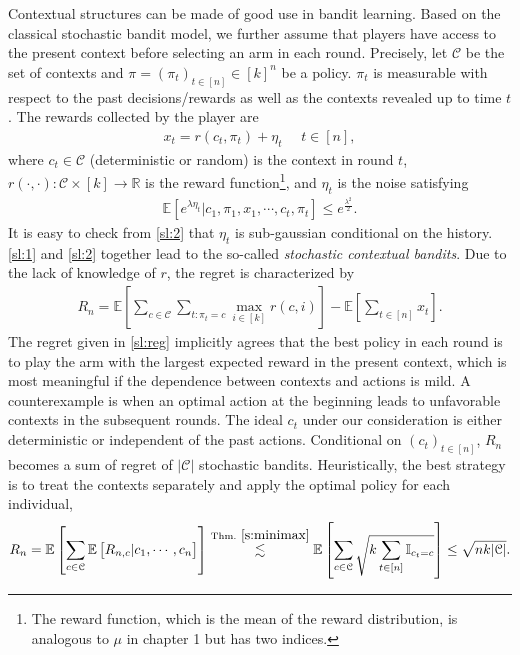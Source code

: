\documentclass[letterpaper,11pt,openright,openany]{book}
\numberwithin{equation}{section}
\theoremstyle{plain}
\theoremstyle{definition}
\def\R{{\mathbb R}}
\def\E{{\mathbb E}}
\def\R{{\mathbb R}}
\begin{document}
Contextual structures can be made of good use in bandit learning. Based on the classical stochastic bandit model, we further assume that players have access to the present context before selecting an arm in each round. Precisely, let $\mathcal C$ be the set of contexts and $\pi=(\pi_t)_{t\in [n]}\in [k]^n$ be a policy. $\pi_t$ is measurable with respect to the past decisions/rewards as well as the contexts revealed up to time $t$. The rewards collected by the player are 
\begin{align}
x_{t} = r(c_t, \pi_t)+\eta_{t}\ \ \ \ \ \ t\in [n],\label{sl:1}
\end{align}
where $c_t\in\mathcal C$ (deterministic or random) is the context in round $t$, $r(\cdot, \cdot):\mathcal C\times [k]\to\R$ is the reward function\footnote{The reward function, which is the mean of the reward distribution, is analogous to $\mu$ in chapter 1 but has two indices.}, and $\eta_{t}$ is the noise satisfying 
\begin{align}
\E[e^{\lambda\eta_{t}}|c_{1}, \pi_{1}, x_{1}, \cdots, c_{t}, \pi_{t}]\leq e^{\frac{\lambda^2}{2}}. \label{sl:2}
\end{align}
It is easy to check from \eqref{sl:2} that $\eta_t$ is sub-gaussian conditional on the history. \eqref{sl:1} and \eqref{sl:2} together lead to the so-called \emph{stochastic contextual bandits}. Due to the lack of knowledge of $r$, the regret is characterized by 
\begin{align}
R_n = \E\left[\sum_{c\in\mathcal C}\sum_{t: \pi_t = c}\max_{i\in [k]}r(c, i)\right] - \E\left[\sum_{t\in [n]}x_{t}\right]. \label{sl:reg}
\end{align}
The regret given in \eqref{sl:reg} implicitly agrees that the best policy in each round is to play the arm with the largest expected reward in the present context, which is most meaningful if the dependence between contexts and actions is mild. A counterexample is when an optimal action at the beginning leads to unfavorable contexts in the subsequent rounds. The ideal $c_t$ under our consideration is either deterministic or independent of the past actions.  Conditional on $(c_t)_{t\in [n]}$, $R_n$ becomes a sum of regret of $|\mathcal C|$ stochastic bandits. Heuristically, the best strategy is to treat the contexts separately and apply the optimal policy for each individual,  
\begin{align}
R_n=\E\left[\sum_{c\in\mathcal C}\E\left[R_{n,c}|c_1, \cdots, c_n\right]\right]\stackrel{\text{Thm.}\ \ref{s:minimax}}{\lesssim}\E\left[\sum_{c\in\mathcal C}\sqrt{k\sum_{t\in [n]}\mathbb I_{c_t = c}}\right]\leq\sqrt{nk|\mathcal C|}.\label{sl:3}
\end{align} 
\end{document}
